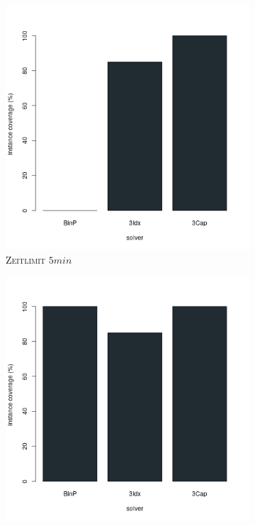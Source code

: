 \begin{figure}[H]
\centering

\begin{subfigure}[b]{0.3\textwidth}
\centering
\includegraphics[width=1.2\textwidth]{img/solver_instance_coverage_b=3_l_300s.png}
\caption{\textsc{Zeitlimit} $5min$}
\label{fig:instance_coverage_b=3_l_a}
\end{subfigure}
\hfill
\begin{subfigure}[b]{0.3\textwidth}
\centering
\includegraphics[width=1.2\textwidth]{img/solver_instance_coverage_b=3_l_900s.png}

\end{subfigure}
\end{figure}
